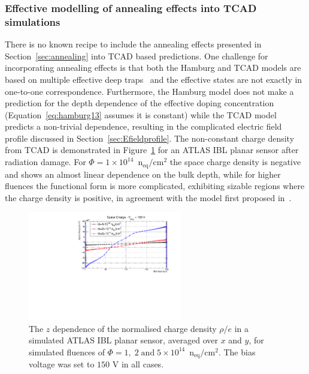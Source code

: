 \subsubsection{Effective modelling of annealing effects into TCAD simulations}
\label{sec:TCADAnneal} 
There is no known recipe to include the annealing effects presented in Section~\ref{sec:annealing} into 
TCAD based predictions.  One challenge for incorporating annealing effects is that both the Hamburg and TCAD models are based on multiple effective deep 
traps~\cite{bib:DP,CHIOCHIA2006} and the effective states are not exactly in one-to-one correspondence.  Furthermore, the Hamburg model does not make a prediction for the depth dependence of the effective doping concentration (Equation~\ref{eq:hamburg13} assumes it is constant) while the TCAD model predicts a non-trivial dependence, resulting in the complicated electric field profile discussed in Section~\ref{sec:Efieldprofile}.  The non-constant charge density from TCAD is demonstrated in Figure~\ref{fig:TCADSpaceCharge} for an ATLAS IBL planar sensor after radiation damage.   For $\Phi=1\times10^{14}$~n$_\text{eq}/\text{cm}^{2}$ the space charge 
density is negative and shows an almost linear dependence on the bulk depth, 
while for higher fluences the 
functional form is more complicated, exhibiting sizable regions where the charge density is positive, 
in agreement with the model first proposed in~\cite{bib:DP}.

\begin{figure}[!htpb]
\centering
\includegraphics[width=0.6\textwidth]{TCAD_SpaceCharge_150V.pdf}
\caption{\label{fig:TCADSpaceCharge}The $z$ dependence of the normalised 
charge density $\rho/e$ in a simulated 
 ATLAS IBL planar sensor, averaged over $x$ and $y$, for  simulated
  fluences of $\Phi=1,\;2\; \text{and}\; 5\times10^{14}$~n$_\text{eq}/\text{cm}^{2}$. The bias voltage was set to $150$ V in all cases.}
\end{figure}

